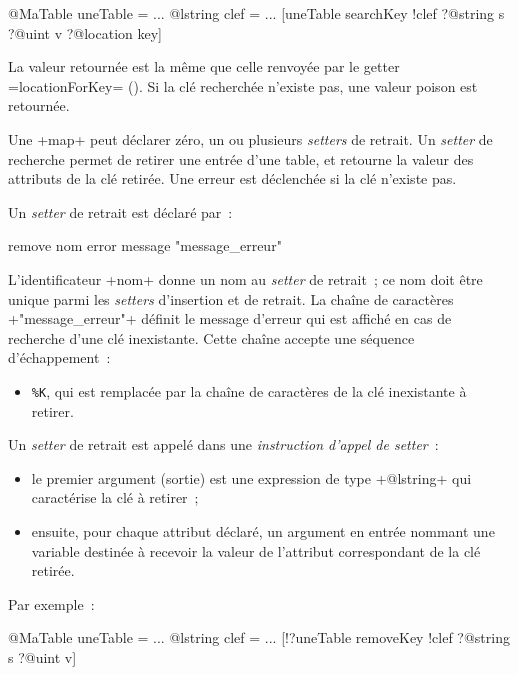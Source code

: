 \begin{galgas}
@MaTable uneTable = {}
...
@lstring clef = ...
[uneTable searchKey !clef ?@string s ?@uint v ?@location key]
\end{galgas}

La valeur retournée est la même que celle renvoyée par le getter \ggs=locationForKey= (). Si la clé recherchée n'existe pas, une valeur poison est retournée.








Une \ggs+map+ peut déclarer zéro, un ou plusieurs \emph{setters} de retrait. Un \emph{setter} de recherche permet de retirer une entrée d'une table, et retourne la valeur des attributs de la clé retirée. Une erreur est déclenchée si la clé n'existe pas.


Un \emph{setter} de retrait est déclaré par~:

\begin{galgas}
remove nom error message "message_erreur"
\end{galgas}

L'identificateur \ggs+nom+ donne un nom au \emph{setter} de retrait~; ce nom doit être unique parmi les \emph{setters} d'insertion et de retrait. La chaîne de caractères \ggs+"message_erreur"+ définit le message d'erreur qui est affiché en cas de recherche d'une clé inexistante. Cette chaîne accepte une séquence d'échappement~:
\begin{itemize}
  \item \texttt{\%K}, qui est remplacée par la chaîne de caractères de la clé inexistante à retirer.
\end{itemize}


Un \emph{setter} de retrait est appelé dans une \emph{instruction d'appel de setter}~:
\begin{itemize}
  \item le premier argument (sortie) est une expression de type \ggs+@lstring+ qui caractérise la clé à retirer~;
  \item ensuite, pour chaque attribut déclaré, un argument en entrée nommant une variable destinée à recevoir la valeur de l'attribut correspondant de la clé retirée.
\end{itemize}

Par exemple~:
\begin{galgas}
@MaTable uneTable = {}
...
@lstring clef = ...
[!?uneTable removeKey !clef ?@string s ?@uint v]
\end{galgas}

